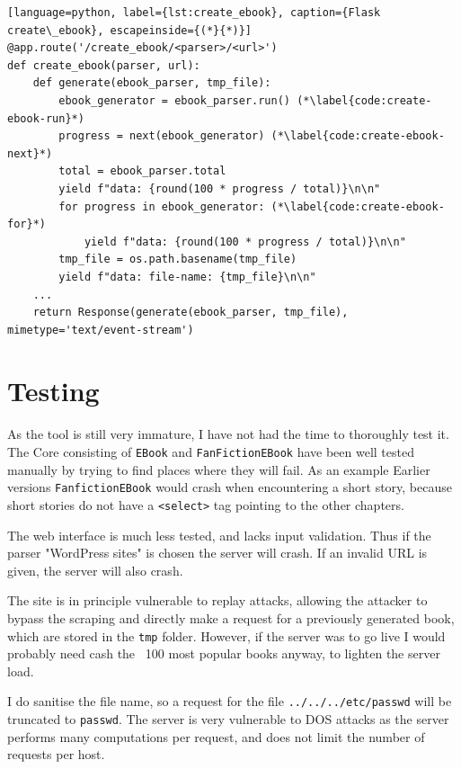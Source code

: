 \documentclass[]{report}   %
\begin{document}
\begin{minipage}{\linewidth}
\begin{lstlisting}[language=python, label={lst:create_ebook}, caption={Flask create\_ebook}, escapeinside={(*}{*)}]
@app.route('/create_ebook/<parser>/<url>')
def create_ebook(parser, url):
    def generate(ebook_parser, tmp_file):
		ebook_generator = ebook_parser.run() (*\label{code:create-ebook-run}*)
		progress = next(ebook_generator) (*\label{code:create-ebook-next}*)
        total = ebook_parser.total
        yield f"data: {round(100 * progress / total)}\n\n"
		for progress in ebook_generator: (*\label{code:create-ebook-for}*)
            yield f"data: {round(100 * progress / total)}\n\n"
        tmp_file = os.path.basename(tmp_file)
        yield f"data: file-name: {tmp_file}\n\n"
	...
    return Response(generate(ebook_parser, tmp_file), mimetype='text/event-stream')
\end{lstlisting}
\end{minipage}

\section{Testing}
As the tool is still very immature, I have not had the time to thoroughly test it.
The Core consisting of \texttt{EBook} and \texttt{FanFictionEBook} have been well tested
manually by trying to find places where they will fail. As an example Earlier
versions \texttt{FanfictionEBook} would crash when encountering a short story, because short stories
do not have a \texttt{<select>} tag pointing to the other chapters.

The web interface is much less tested, and lacks input validation. Thus if the
parser "WordPress sites" is chosen the server will crash. If an invalid URL is
given, the server will also crash. 

The site is in principle vulnerable to replay attacks, allowing the attacker
to bypass the scraping and directly make a request for a previously generated
book, which are stored in the \texttt{tmp} folder. However, if the server was
to go live I would probably need cash the ~100 most popular books anyway, to
lighten the server load.

I do sanitise the file name, so a request for the file
\texttt{../../../etc/passwd} will be truncated to \texttt{passwd}.  The server
is very vulnerable to DOS attacks as the server performs many computations per
request, and does not limit the number of requests per host.
\end{document}
